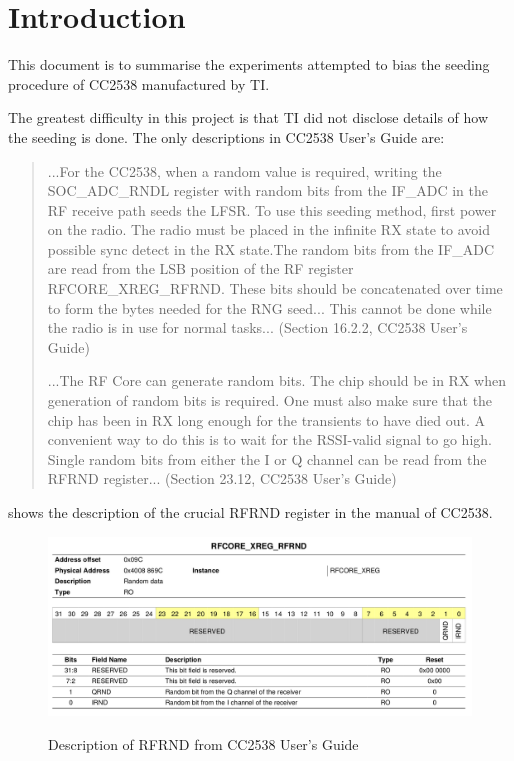 \section{Introduction}

This document is to summarise the experiments attempted to bias the seeding procedure of CC2538\cite{CC2538_Manual} manufactured by TI.

The greatest difficulty in this project is that TI did not disclose details of how the seeding is done. The only descriptions in CC2538 User's Guide are:
\begin{quote}
...For the CC2538, when a random value is required, writing the SOC\_ADC\_RNDL register with random bits from the IF\_ADC in the RF receive path seeds the LFSR. To use this seeding method, first power on the radio. The radio must be placed in the infinite RX state to avoid possible sync detect in the RX state.The random bits from the IF\_ADC are read from the LSB position of the RF register RFCORE\_XREG\_RFRND. These bits should be concatenated over time to form the bytes needed for the RNG seed... This cannot be done while the radio is in use for normal tasks... (Section 16.2.2, CC2538 User's Guide)

...The RF Core can generate random bits. The chip should be in RX when generation of random bits is required. One must also make sure that the chip has been in RX long enough for the transients to have died out. A convenient way to do this is to wait for the RSSI-valid signal to go high. Single random bits from either the I or Q channel can be read from the RFRND register... (Section 23.12, CC2538 User's Guide)
\end{quote}

 shows the description of the crucial RFRND register in the manual of CC2538.

\begin{figure}
\center
\caption{Description of RFRND from CC2538 User's Guide}
\includegraphics[width=\linewidth]{./figures/CC2538_RFRND.png}
\label{CC2538_RFRND}
\end{figure}


